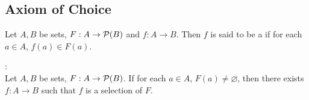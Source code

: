\documentclass{book}
\begin{document}
	
	
	
	
	
	
	
	
	
	
	
	
	
	
	
	
	
	
	
	
	
	
	
	
	
	
	
	
	
	
	
	
	
	
	
	
	
	
	
	
	
	
	
	
	
	
	
	
	
	
	
	\subsection{Axiom of Choice}
	
	\begin{defn}
		Let $A, B$ be sets, $F:A \rightarrow \mathcal{P}(B)$ and $f: A \rightarrow B$. Then $f$ is said to be a  if for each $a \in A$, $f(a) \in F(a)$.
	\end{defn}
	
	\begin{ax} : \\
		Let $A, B$ be sets, $F:A \rightarrow \mathcal{P}(B)$. If for each $a \in A$, $F(a) \neq \varnothing$, then there exists $f:A \rightarrow B$ such that $f$ is a selection of $F$.  
	\end{ax}
	
	
	
	
	
	
	
	
	
	
	
	
	
	
	
	
	
	
	
	
	
	
	
	
	
	
	
	
	
\end{document}
